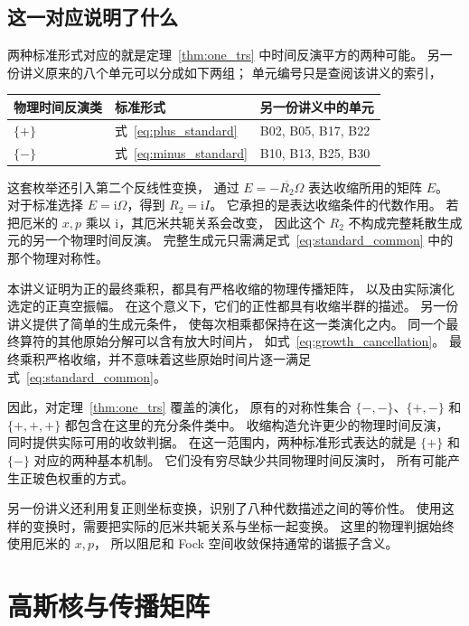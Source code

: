 \documentclass[UTF8,11pt,a4paper,fontset=fandol]{ctexart}
\newcommand{\ii}{\mathrm i}
\numberwithin{equation}{section}
\begin{document}
\subsection{这一对应说明了什么}

两种标准形式对应的就是定理~\ref{thm:one_trs} 中时间反演平方的两种可能。
另一份讲义原来的八个单元可以分成如下两组；
单元编号只是查阅该讲义的索引，
\begin{center}
\begin{tabular}{lll}
\toprule
物理时间反演类 & 标准形式 & 另一份讲义中的单元\\
\midrule
$\{+\}$ & 式~\eqref{eq:plus_standard} & B02, B05, B17, B22\\
$\{-\}$ & 式~\eqref{eq:minus_standard} & B10, B13, B25, B30\\
\bottomrule
\end{tabular}
\end{center}
这套枚举还引入第二个反线性变换，
通过 $E=-\overline{R_2}\Omega$ 表达收缩所用的矩阵 $E$。
对于标准选择 $E=\ii\Omega$，得到 $R_2=\ii I$。
它承担的是表达收缩条件的代数作用。
若把厄米的 $x,p$ 乘以 $\ii$，其厄米共轭关系会改变，
因此这个 $R_2$ 不构成完整耗散生成元的另一个物理时间反演。
完整生成元只需满足式~\eqref{eq:standard_common} 中的那个物理对称性。

本讲义证明为正的最终乘积，都具有严格收缩的物理传播矩阵，
以及由实际演化选定的正真空振幅。
在这个意义下，它们的正性都具有收缩半群的描述。
另一份讲义提供了简单的生成元条件，
使每次相乘都保持在这一类演化之内。
同一个最终算符的其他原始分解可以含有放大时间片，
如式~\eqref{eq:growth_cancellation}。
最终乘积严格收缩，并不意味着这些原始时间片逐一满足
式~\eqref{eq:standard_common}。

因此，对定理~\ref{thm:one_trs} 覆盖的演化，
原有的对称性集合 $\{-,-\}$、$\{+,-\}$ 和 $\{+,+,+\}$
都包含在这里的充分条件类中。
收缩构造允许更少的物理时间反演，
同时提供实际可用的收敛判据。
在这一范围内，两种标准形式表达的就是 $\{+\}$ 和 $\{-\}$
对应的两种基本机制。
它们没有穷尽缺少共同物理时间反演时，
所有可能产生正玻色权重的方式。

另一份讲义还利用复正则坐标变换，识别了八种代数描述之间的等价性。
使用这样的变换时，需要把实际的厄米共轭关系与坐标一起变换。
这里的物理判据始终使用厄米的 $x,p$，
所以阻尼和 Fock 空间收敛保持通常的谐振子含义。

\appendix
\section{高斯核与传播矩阵}
\label{app:kernel}
\end{document}
